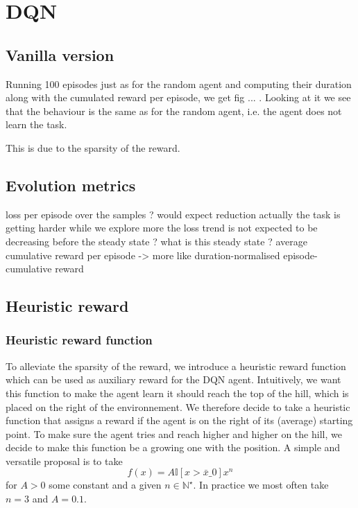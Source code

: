 \documentclass[a4paper, 12pt,oneside]{article}
\begin{document}
    \section{DQN}
        \subsection{Vanilla version}
        Running 100 episodes just as for the random agent and computing their duration along with the cumulated reward per episode, we get fig ... . Looking at it we see that the behaviour is the same as for the random agent, i.e. the agent does not learn the task.
    
        This is due to the sparsity of the reward. 
        \subsection{Evolution metrics}
        loss per episode over the samples ? 
        would expect reduction 
        actually the task is getting harder while we explore more
        the loss trend is not expected to be decreasing before the steady state ?
           what is this steady state ?
     average cumulative reward per episode -> more like duration-normalised episode-cumulative reward 
        \subsection{Heuristic reward}
        \subsubsection{Heuristic reward function}
        To alleviate the sparsity of the reward, we introduce a heuristic reward function which can be used as auxiliary reward for the DQN agent. Intuitively, we want this function to make the agent learn it should reach the top of the hill, which is placed on the right of the environnement. We therefore decide to take a heuristic function that assigns a reward if the agent is on the right of its (average) starting point. To make sure the agent tries and reach higher and higher on the hill, we decide to make this function be a growing one with the position. A simple and versatile proposal is to take 
        $$
        f(x) = A\mathbb I[x>\bar x\_0]x^n
        $$
        for $A>0$ some constant and a given $n\in\mathbb N^\star$. In practice we most often take $n=3$ and $A=0.1$.  
\end{document}
